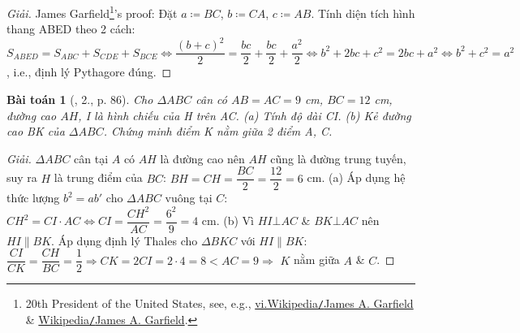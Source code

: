 \documentclass{article}
\newtheorem{baitoan}{Bài toán}
\begin{document}
\begin{proof}[Giải]
	James Garfield\footnote{20th President of the United States, see, e.g., \href{https://vi.wikipedia.org/wiki/James_A._Garfield}{vi.Wikipedia{\tt/}James A. Garfield} \& \href{https://en.wikipedia.org/wiki/James_A._Garfield}{Wikipedia{\tt/}James A. Garfield}.}'s proof: Đặt $a\coloneqq BC$, $b\coloneqq CA$, $c\coloneqq AB$. Tính diện tích hình thang ABED theo 2 cách: $S_{ABED} = S_{ABC} + S_{CDE} + S_{BCE}\Leftrightarrow\dfrac{(b + c)^2}{2} = \dfrac{bc}{2} + \dfrac{bc}{2} + \dfrac{a^2}{2}\Leftrightarrow b^2 + 2bc + c^2 = 2bc + a^2\Leftrightarrow b^2 + c^2 = a^2$, i.e., định lý Pythagore đúng.
\end{proof}

\begin{baitoan}[\cite{Binh_Toan_9_tap_1}, 2., p. 86]
	Cho $\Delta ABC$ cân có $AB = AC = 9$ {\rm cm}, $BC = 12$ {\rm cm}, đường cao $AH$, I là hình chiếu của H trên AC. (a) Tính độ dài CI. (b) Kẻ đường cao BK của $\Delta ABC$. Chứng minh điểm K nằm giữa 2 điểm A, C.
\end{baitoan}

\begin{center}
\end{center}

\begin{proof}[Giải]
	$\Delta ABC$ cân tại $A$ có $AH$ là đường cao nên $AH$ cũng là đường trung tuyến, suy ra $H$ là trung điểm của $BC$: $BH = CH = \dfrac{BC}{2} = \dfrac{12}{2} = 6$ cm. (a) Áp dụng hệ thức lượng $b^2 = ab'$ cho $\Delta ABC$ vuông tại $C$: $CH^2 = CI\cdot AC\Leftrightarrow CI = \dfrac{CH^2}{AC} = \dfrac{6^2}{9} = 4$ cm. (b) Vì $HI\bot AC$ \& $BK\bot AC$ nên $HI\parallel BK$. Áp dụng định lý Thales cho $\Delta BKC$ với $HI\parallel BK$: $\dfrac{CI}{CK} = \dfrac{CH}{BC} = \dfrac{1}{2}\Rightarrow CK = 2CI = 2\cdot4 = 8 < AC = 9\Rightarrow$ $K$ nằm giữa $A$ \& $C$.
\end{proof}
\end{document}
